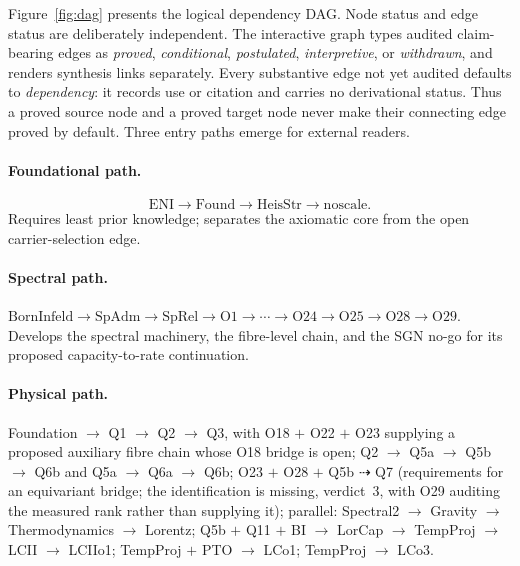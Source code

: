 \documentclass[11pt,a4paper]{article}
\begin{document}
  Figure~\ref{fig:dag} presents the logical dependency DAG.
  Node status and edge status are deliberately independent.
  The interactive graph types audited claim-bearing edges as \emph{proved}, \emph{conditional},
  \emph{postulated}, \emph{interpretive}, or \emph{withdrawn}, and renders synthesis links separately.
  Every substantive edge not yet audited defaults to \emph{dependency}: it records use or citation and
  carries no derivational status.
  Thus a proved source node and a proved target node never make their connecting edge proved by default.
  Three entry paths emerge for external readers.

  \paragraph{Foundational path.}
    \[
      \mathrm{ENI} \to \mathrm{Found} \to \mathrm{HeisStr} \to \mathrm{noscale}.
    \]
    Requires least prior knowledge; separates the axiomatic core from the open carrier-selection edge.

  \paragraph{Spectral path.}
    $\text{BornInfeld} \to \text{SpAdm} \to \text{SpRel} \to \text{O1} \to \cdots \to \text{O24} \to \text{O25} \to
    \text{O28} \to \text{O29}$.
    Develops the spectral machinery, the fibre-level chain, and the SGN no-go for its proposed
    capacity-to-rate continuation.

  \paragraph{Physical path.}
    Foundation $\to$ Q1 $\to$ Q2 $\to$ Q3, with O18 $+$ O22 $+$ O23 supplying a
    proposed auxiliary fibre chain whose O18 bridge is open; Q2 $\to$ Q5a $\to$ Q5b $\to$ Q6b and
    Q5a $\to$ Q6a $\to$ Q6b;
    O23 $+$ O28 $+$ Q5b $\dashrightarrow$ Q7 (requirements for an equivariant bridge; the
    identification is
    missing, verdict~3, with O29 auditing the measured rank rather than supplying it);
    parallel: Spectral2 $\to$ Gravity $\to$ Thermodynamics $\to$ Lorentz;
    Q5b $+$ Q11 $+$ BI $\to$ LorCap $\to$ TempProj $\to$ LCII $\to$ LCIIo1; TempProj $+$ PTO $\to$ LCo1; TempProj $\to$ LCo3.
\end{document}
